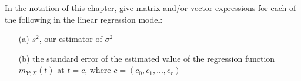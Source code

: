 \oneproblem
In the notation of this chapter, give matrix and/or vector
expressions for each of the following in the linear regression model:

\begin{itemize}

\item [(a)] $s^2$, our estimator of $\sigma^2$

\item [(b)] the standard error of the estimated value of the
regression function $m_{Y;X}(t)$ at $t = c$, where $c =
(c_0,c_1,...,c_r)$

\end{itemize}

% 
% 
% 
% 
